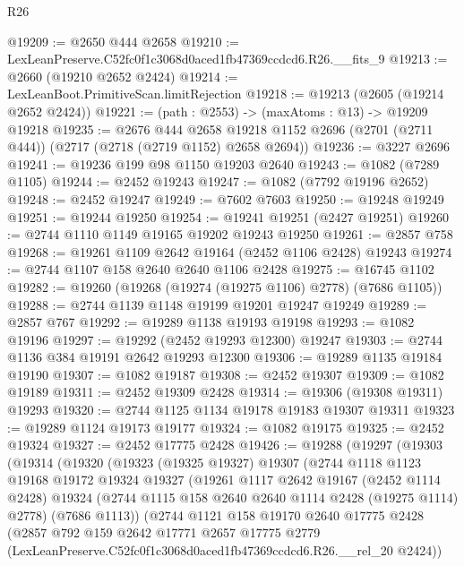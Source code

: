 \begin{lexlean}{R26}
\begin{coremodule}
@19209 := @2650 @444 @2658
@19210 := LexLeanPreserve.C52fc0f1c3068d0aced1fb47369ccdcd6.R26.__fits_9
@19213 := @2660 (@19210 @2652 @2424)
@19214 := LexLeanBoot.PrimitiveScan.limitRejection
@19218 := @19213 (@2605 (@19214 @2652 @2424))
@19221 := (path : @2553) -> (maxAtoms : @13) -> @19209 @19218
@19235 := @2676
    @444
    @2658
    @19218
    @1152
    @2696
    (@2701 (@2711 @444))
    (@2717 (@2718 (@2719 @1152) @2658 @2694))
@19236 := @3227 @2696
@19241 := @19236 @199 @98 @1150 @19203 @2640
@19243 := @1082 (@7289 @1105)
@19244 := @2452 @19243
@19247 := @1082 (@7792 @19196 @2652)
@19248 := @2452 @19247
@19249 := @7602 @7603
@19250 := @19248 @19249
@19251 := @19244 @19250
@19254 := @19241 @19251 (@2427 @19251)
@19260 := @2744 @1110 @1149 @19165 @19202 @19243 @19250
@19261 := @2857 @758
@19268 := @19261 @1109 @2642 @19164 (@2452 @1106 @2428) @19243
@19274 := @2744 @1107 @158 @2640 @2640 @1106 @2428
@19275 := @16745 @1102
@19282 := @19260 (@19268 (@19274 (@19275 @1106) @2778) (@7686 @1105))
@19288 := @2744 @1139 @1148 @19199 @19201 @19247 @19249
@19289 := @2857 @767
@19292 := @19289 @1138 @19193 @19198
@19293 := @1082 @19196
@19297 := @19292 (@2452 @19293 @12300) @19247
@19303 := @2744 @1136 @384 @19191 @2642 @19293 @12300
@19306 := @19289 @1135 @19184 @19190
@19307 := @1082 @19187
@19308 := @2452 @19307
@19309 := @1082 @19189
@19311 := @2452 @19309 @2428
@19314 := @19306 (@19308 @19311) @19293
@19320 := @2744 @1125 @1134 @19178 @19183 @19307 @19311
@19323 := @19289 @1124 @19173 @19177
@19324 := @1082 @19175
@19325 := @2452 @19324
@19327 := @2452 @17775 @2428
@19426 := @19288
    (@19297
      (@19303
        (@19314
          (@19320
            (@19323
              (@19325 @19327)
              @19307
              (@2744
                @1118
                @1123
                @19168
                @19172
                @19324
                @19327
                (@19261
                  @1117
                  @2642
                  @19167
                  (@2452 @1114 @2428)
                  @19324
                  (@2744 @1115 @158 @2640 @2640 @1114 @2428 (@19275 @1114) @2778)
                  (@7686 @1113))
                (@2744
                  @1121
                  @158
                  @19170
                  @2640
                  @17775
                  @2428
                  (@2857
                    @792
                    @159
                    @2642
                    @17771
                    @2657
                    @17775
                    @2779
                    (LexLeanPreserve.C52fc0f1c3068d0aced1fb47369ccdcd6.R26.__rel_20 @2424))

\end{coremodule}
\end{lexlean}
